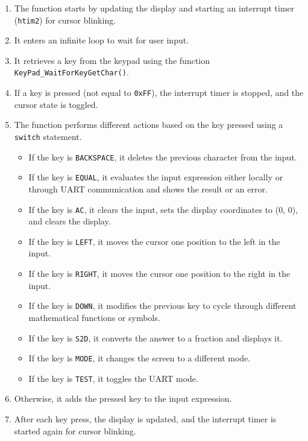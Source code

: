\documentclass[a4paper, twoside]{report}
\begin{document}
\begin{enumerate}
    \item The function starts by updating the display and starting an interrupt timer (\texttt{htim2}) for cursor blinking.
    \item It enters an infinite loop to wait for user input.
    \item It retrieves a key from the keypad using the function \texttt{KeyPad_WaitForKeyGetChar()}.
    \item If a key is pressed (not equal to \texttt{0xFF}), the interrupt timer is stopped, and the cursor state is toggled.
    \item The function performs different actions based on the key pressed using a \texttt{switch} statement.
    \begin{itemize}
        \item If the key is \texttt{BACKSPACE}, it deletes the previous character from the input.
        \item If the key is \texttt{EQUAL}, it evaluates the input expression either locally or through UART communication and shows the result or an error.
        \item If the key is \texttt{AC}, it clears the input, sets the display coordinates to (0, 0), and clears the display.
        \item If the key is \texttt{LEFT}, it moves the cursor one position to the left in the input.
        \item If the key is \texttt{RIGHT}, it moves the cursor one position to the right in the input.
        \item If the key is \texttt{DOWN}, it modifies the previous key to cycle through different mathematical functions or symbols.
        \item If the key is \texttt{S2D}, it converts the answer to a fraction and displays it.
        \item If the key is \texttt{MODE}, it changes the screen to a different mode.
        \item If the key is \texttt{TEST}, it toggles the UART mode.
    \end{itemize}
    \item Otherwise, it adds the pressed key to the input expression.
    \item After each key press, the display is updated, and the interrupt timer is started again for cursor blinking.
\end{enumerate}
\end{document}
